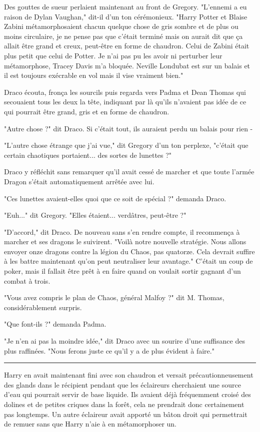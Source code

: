 Des gouttes de sueur perlaient maintenant au front de Gregory. "L'ennemi a eu raison de Dylan Vaughan," dit-il d'un ton cérémonieux. "Harry Potter et Blaise Zabini métamorphosaient chacun quelque chose de gris sombre et de plus ou moins circulaire, je ne pense pas que c'était terminé mais on aurait dit que ça allait être grand et creux, peut-être en forme de chaudron. Celui de Zabini était plus petit que celui de Potter. Je n'ai pas pu les avoir ni perturber leur métamorphose, Tracey Davis m'a bloquée. Neville Londubat est sur un balais et il est toujours exécrable en vol mais il vise vraiment bien."

Draco écouta, fronça les sourcils puis regarda vers Padma et Dean Thomas qui secouaient tous les deux la tête, indiquant par là qu'ils n'avaient pas idée de ce qui pourrait être grand, gris et en forme de chaudron.

"Autre chose ?" dit Draco. Si c'était tout, ils auraient perdu un balais pour rien -

"L'autre chose étrange que j'ai vue," dit Gregory d'un ton perplexe, "c'était que certain chaotiques portaient... des sortes de lunettes ?"

Draco y réfléchit sans remarquer qu'il avait cessé de marcher et que toute l'armée Dragon s'était automatiquement arrêtée avec lui.

"Ces lunettes avaient-elles quoi que ce soit de spécial ?" demanda Draco.

"Euh..." dit Gregory. "Elles étaient... verdâtres, peut-être ?"

"D'accord," dit Draco. De nouveau sans s'en rendre compte, il recommença à marcher et ses dragons le suivirent. "Voilà notre nouvelle stratégie. Nous allons envoyer onze dragons contre la légion du Chaos, pas quatorze. Cela devrait suffire à les battre maintenant qu'on peut neutraliser leur avantage." C'était un coup de poker, mais il fallait être prêt à en faire quand on voulait sortir gagnant d'un combat à trois.

"Vous avez compris le plan de Chaos, général Malfoy ?" dit M. Thomas, considérablement surpris.

"Que font-ils ?" demanda Padma.

"Je n'en ai pas la moindre idée," dit Draco avec un sourire d'une suffisance des plus raffinées. "Nous ferons juste ce qu'il y a de plus évident à faire."
\par\noindent\rule{\textwidth}{0.4pt}
Harry en avait maintenant fini avec son chaudron et versait précautionneusement des glands dans le récipient pendant que les éclaireurs cherchaient une source d'eau qui pourrait servir de base liquide. Ils avaient déjà fréquemment croisé des dolines et de petites criques dans la forêt, cela ne prendrait donc certainement pas longtemps. Un autre éclaireur avait apporté un bâton droit qui permettrait de remuer sans que Harry n'aie à en métamorphoser un.

